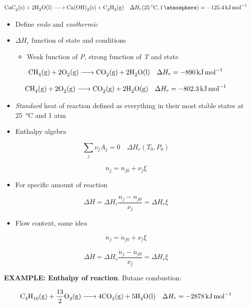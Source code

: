 \documentclass[11pt]{article}
\begin{document}
\[\ce{CaC2(s) + 2 H2O (l) -> Ca(OH)2 (s) + C2H2 (g)}   \quad \Delta H_{r}(\SI{25}{\celsius},\SI{1}{\atmosphere}) = \SI{-125.4}{\kilo\joule\per\mole}\]

\begin{itemize}
\item Define \emph{endo} and \emph{exothermic}
\item \(\Delta H_{r}\) function of state and conditions
\begin{itemize}
\item Weak function of \emph{P}, strong function of \emph{T} and state
\end{itemize}
\end{itemize}

\[\ce{CH4(g) + 2 O2 (g) -> CO2(g) + 2 H2O (l)} \quad \Delta H_{r} = \SI{-890}{\kilo\joule\per\mole} \]

\[\ce{CH4(g) + 2 O2 (g) -> CO2(g) + 2 H2O (g)} \quad \Delta H_{r} = \SI{-802.3}{\kilo\joule\per\mole} \]

\begin{itemize}
\item \emph{Standard} heat of reaction defined as everything in their most stable states at \SI{25}{\celsius} and 1 atm

\item Enthalpy algebra
\end{itemize}

\[ \sum_{j} \nu_{j}A_{j}=0  \quad \Delta H_{r}(T_{0},P_{0}) \]

\[ n_{j} = n_{j0} + \nu_{j}\xi \]

\begin{itemize}
\item For specific amount of reaction
\end{itemize}

\[ \Delta H = \Delta H_{r} \frac{n_{j}-n_{j0}}{\nu_{j}} = \Delta H_{r} \xi \]

\begin{itemize}
\item Flow context, same idea
\end{itemize}

\[ \dot{n}_{j} = \dot{n}_{j0} + \nu_{j}\xi \]

\[ \Delta \dot{H} = \Delta H_{r} \frac{\dot{n}_{j}-\dot{n}_{j0}}{\nu_{j}} = \Delta H_{r} \xi \]

\begin{framed}
\noindent \textbf{EXAMPLE: Enthalpy of reaction}.  Butane combustion:

\[ \ce{C4H10 (g) + 13/2 O2(g) -> 4 CO2(g) + 5 H2O (l)}\quad \Delta H_{r} =\SI{-2878}{\kilo\joule\per\mole} \]
\end{framed}
\end{document}
